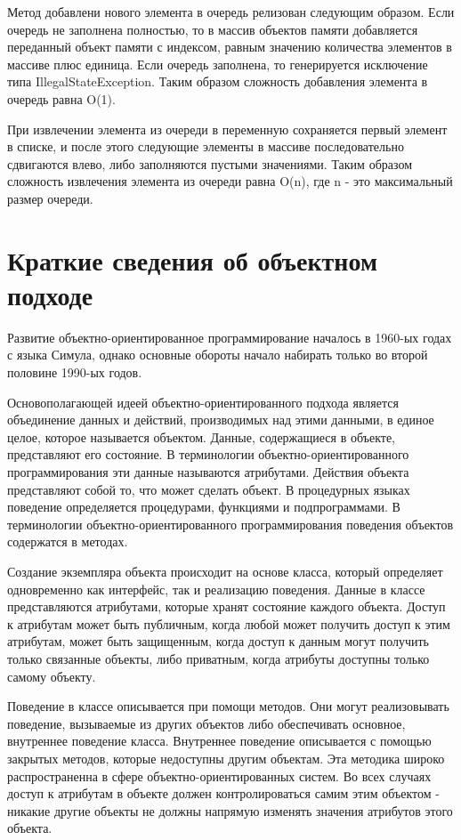 \documentclass[russian,utf8,simple,hpadding=10mm,vpadding=20mm]{eskdtext}
\begin{document}
Метод добавлени нового элемента в очередь релизован следующим образом. Если очередь не заполнена полностью, то в массив объектов памяти добавляется переданный объект памяти с индексом, равным значению количества элементов в массиве плюс единица. Если очередь заполнена, то генерируется исключение типа IllegalStateException. Таким образом сложность добавления элемента в очередь равна O(1).

При извлечении элемента из очереди в переменную сохраняется первый элемент в списке, и после этого следующие элементы в массиве последовательно сдвигаются влево, либо заполняются пустыми значениями. Таким образом сложность извлечения элемента из очереди равна O(n), где n - это максимальный размер очереди.

\newpage
\parindent=15mm
\doublespacing
\section{Краткие сведения об объектном подходе}
Развитие объектно-ориентированное программирование началось в 1960-ых годах с языка Симула, однако основные обороты начало набирать только во второй половине 1990-ых годов. 

Основополагающей идеей объектно-ориентированного подхода является объединение данных и действий, производимых над этими данными, в единое целое, которое называется объектом. Данные, содержащиеся в объекте, представляют его состояние. В терминологии объектно-ориентированного программирования эти данные называются атрибутами. Действия объекта представляют собой то, что может сделать объект. В процедурных языках поведение определяется процедурами, функциями и подпрограммами. В терминологии объектно-ориентированного программирования поведения объектов содержатся в методах.

Создание экземпляра объекта происходит на основе класса, который определяет одновременно как интерфейс, так и реализацию поведения. Данные в классе представляются атрибутами, которые хранят состояние каждого объекта. Доступ к атрибутам может быть публичным, когда любой может получить доступ к этим атрибутам, может быть защищенным, когда доступ к данным могут получить только связанные объекты, либо приватным, когда атрибуты доступны только самому объекту.

Поведение в классе описывается при помощи методов. Они могут реализовывать поведение, вызываемые из других объектов либо обеспечивать основное, внутреннее поведение класса. Внутреннее поведение описывается с помощью закрытых методов, которые недоступны другим объектам.  Эта методика широко распространенна в сфере объектно-ориентированных систем. Во всех случаях доступ к атрибутам в объекте должен контролироваться самим этим объектом - никакие другие объекты не должны напрямую изменять значения атрибутов этого объекта.
\end{document}
